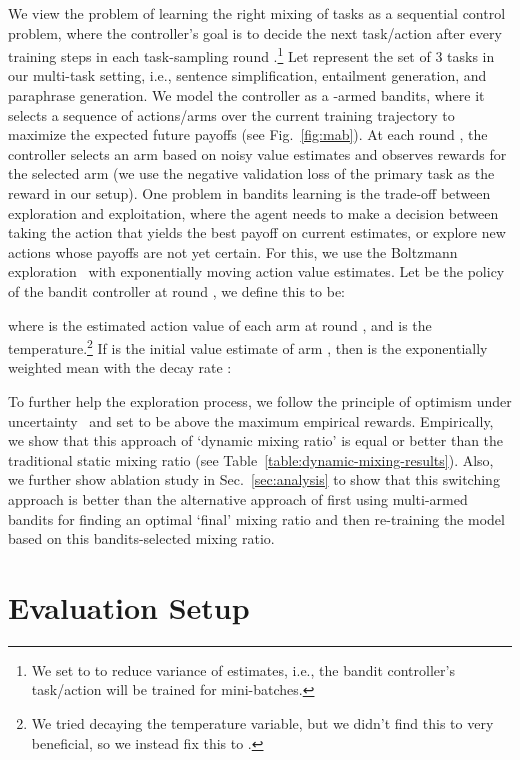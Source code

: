 \documentclass[11pt]{article}
\begin{document}
We view the problem of learning the right mixing of tasks as a sequential control problem, where the controller's goal is to decide the next task/action after every  training steps in each task-sampling round .\footnote{We set  to  to reduce variance of estimates, i.e., the bandit controller's task/action will be trained for  mini-batches.} Let  represent the set of 3 tasks in our multi-task setting, i.e., sentence simplification, entailment generation, and paraphrase generation. We model the controller as a -armed bandits, where it selects a sequence of actions/arms over the current training trajectory to maximize the expected future payoffs (see Fig.~\ref{fig:mab}). At each round , the controller selects an arm based on noisy value estimates and observes rewards  for the selected arm (we use the  negative validation loss of the primary task as the reward in our setup). One problem in bandits learning is the trade-off between exploration and exploitation, where the agent needs to make a decision between taking the action that yields the best payoff on current estimates, or explore new actions whose payoffs are not yet certain. For this, we use the Boltzmann exploration~\cite{kaelbling1996reinforcement} with exponentially moving action value estimates. Let  be the policy of the bandit controller at round , we define this to be:
\vspace{-9pt}

where  is the estimated action value of each arm  at round , and  is the temperature.\footnote{We tried decaying the temperature variable, but we didn't find this to very beneficial, so we instead fix this to .} If  is the initial value estimate of arm , then  is the exponentially weighted mean with the decay rate :
\vspace{-9pt}

To further help the exploration process, we follow the principle of optimism under uncertainty~\cite{sutton1998reinforcement} and set  to be above the maximum empirical rewards. Empirically, we show that this approach of `dynamic mixing ratio' is equal or better than the traditional static mixing ratio (see Table~\ref{table:dynamic-mixing-results}).
Also, we further show ablation study in Sec.~\ref{sec:analysis} to show that this switching approach is better than the alternative approach of first using multi-armed bandits for finding an optimal `final' mixing ratio and then re-training the model based on this bandits-selected mixing ratio.

 


\section{Evaluation Setup}
\label{section:setup}
\end{document}

